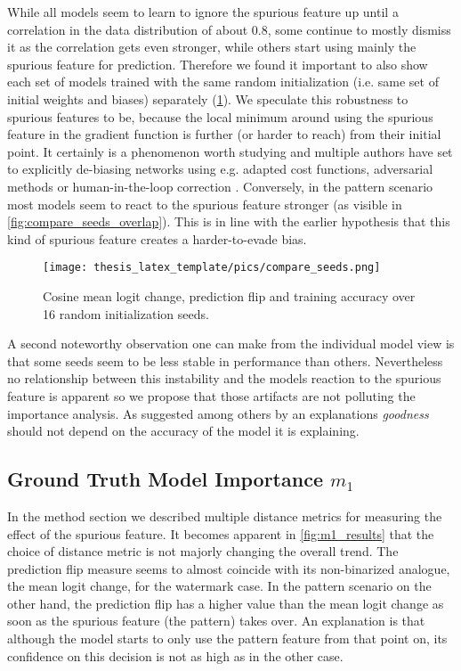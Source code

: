 While all models seem to learn to ignore the spurious feature up until a correlation in the data distribution of about 0.8, some continue to mostly dismiss it as the correlation gets even stronger, while others start using mainly the spurious feature for prediction. Therefore we found it important to also show each set of models trained with the same random initialization (i.e. same set of initial weights and biases) separately (\cref{fig:gt_over_seeds}). We speculate this robustness to spurious features to be, because the local minimum around using the spurious feature in the gradient function is further (or harder to reach) from their initial point. It certainly is a phenomenon worth studying and multiple authors have set to explicitly de-biasing networks using e.g. adapted cost functions, adversarial methods or human-in-the-loop correction \citep{Anders2022,Pahde2023,Reimers2021, Reimers2021b, Dreyer2023a}.
Conversely, in the pattern scenario most models seem to react to the spurious feature stronger (as visible in \cref{fig:compare_seeds_overlap}). This is in line with the earlier hypothesis that this kind of spurious feature creates a harder-to-evade bias.  

\begin{figure}[t!]
    \centering
    \texttt{[image: thesis\_latex\_template/pics/compare\_seeds.png]}
    \caption[Comparing Random Initialization Seeds, Watermark Scenario]{Cosine mean logit change, prediction flip and training accuracy over 16 random initialization seeds.
    }
    \label{fig:gt_over_seeds}
\end{figure}

A second noteworthy observation one can make from the individual model view is that some seeds seem to be less stable in performance than others. Nevertheless no relationship between this instability and the models reaction to the spurious feature is apparent so we propose that those artifacts are not polluting the importance analysis. As suggested among others by \citet{Karimi2023} an explanations \textit{goodness} should not depend on the accuracy of the model it is explaining. 

\subsection{Ground Truth Model Importance $m_1$}
In the method section we described multiple distance metrics for measuring the effect of the spurious feature. It becomes apparent in \cref{fig:m1_results} that the choice of distance metric is not majorly changing the overall trend.
The prediction flip measure seems to almost coincide with its non-binarized analogue, the mean logit change, for the watermark case.
In the pattern scenario on the other hand, the prediction flip has a higher value than the mean logit change as soon as the spurious feature (the pattern) takes over. An explanation is that although the model starts to only use the pattern feature from that point on, its confidence on this decision is not as high as in the other case.

